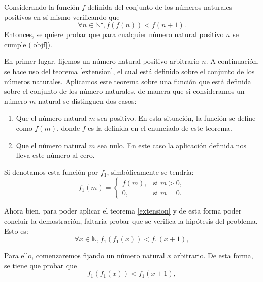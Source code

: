 \begin{demostracion}
  Considerando la función \(f\) definida del conjunto de los números
  naturales positivos en sí mismo verificando que
  \begin{equation}\label{h}\tag{h}
    ∀ n ∈ ℕ⁺, f(f(n)) < f(n+1).
  \end{equation}
  Entonces, se quiere probar que para cualquier número natural positivo
  \(n\) se cumple (\ref{objf}).

  En primer lugar, fijemos un número natural positivo arbitrario
  \(n\). A continuación, se hace uso del teorema \ref{extension}, el
  cual está definido sobre el conjunto de los números
  naturales. Aplicamos este teorema sobre una función que está definida
  sobre el conjunto de los número naturales, de manera que si
  consideramos un número \(m\) natural se distinguen dos casos:
  \begin{enumerate}
  \item Que el número natural \(m\) sea positivo. En esta situación,
    la función se define como \(f(m)\), donde \(f\) es la definida en el
    enunciado de este teorema.
  \item Que el número natural \(m\) sea nulo. En este caso la aplicación
    definida nos lleva este número al cero.
  \end{enumerate}

  Si denotamos esta función por \(f_1\), simbólicamente se tendría:
  \begin{equation}\label{f1}
    f_1(m)=\left\lbrace\begin{array}{ll}
                         f(m), & \text{si } m>0, \\
                         0, & \text{si } m=0.
                       \end{array}\right.
  \end{equation}

  Ahora bien, para poder aplicar el teorema \ref{extension} y de esta
  forma poder concluir la demostración, faltaría probar que se verifica
  la hipótesis del problema. Esto es:
  \begin{equation}
    ∀x∈ ℕ, f_1(f_1(x)) < f_1(x+1),
  \end{equation}

  Para ello, comenzaremos fijando un número natural \(x\) arbitrario. De
  esta forma, se tiene que probar que
  \begin{equation}\label{probar}
    f_1(f_1(x)) <f_1(x+1),
  \end{equation}


\end{demostracion}
